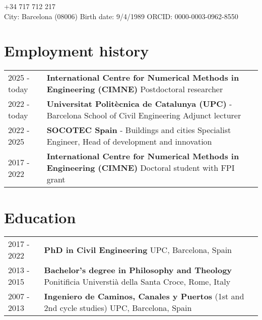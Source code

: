 \documentclass[12pt]{article}
\author{Miguel Masó, PhD}
\begin{document}
\maketitle
{} \qquad +34 717 712 217 \\
City: Barcelona (08006) \qquad
Birth date: 9/4/1989 \qquad
ORCID: 0000-0003-0962-8550


\section{Employment history}
\begin{tabularx}{\linewidth}{lX}
    2025 - today &
    \textbf{International Centre for Numerical Methods in Engineering (CIMNE)} \newline
    Postdoctoral researcher \\

    2022 - today &
    \textbf{Universitat Politècnica de Catalunya (UPC)} - Barcelona School of Civil Engineering \newline
    Adjunct lecturer \\ 

    2022 - 2025 &
    \textbf{SOCOTEC Spain} - Buildings and cities \newline
    Specialist Engineer, Head of development and innovation \\

    2017 - 2022 &
    \textbf{International Centre for Numerical Methods in Engineering (CIMNE)} \newline
    Doctoral student with FPI grant \\
\end{tabularx}


\section{Education}
\begin{tabularx}{\linewidth}{lX}
    2017 - 2022 &
    \textbf{PhD in Civil Engineering} \newline
    UPC, Barcelona, Spain \\

    2013 - 2015 &
    \textbf{Bachelor's degree in Philosophy and Theology} \newline
    Ponitificia Universtià della Santa Croce, Rome, Italy \\

    2007 - 2013 &
    \textbf{Ingeniero de Caminos, Canales y Puertos} (1st and 2nd cycle studies) \newline
    UPC, Barcelona, Spain \\
\end{tabularx}
\end{document}
